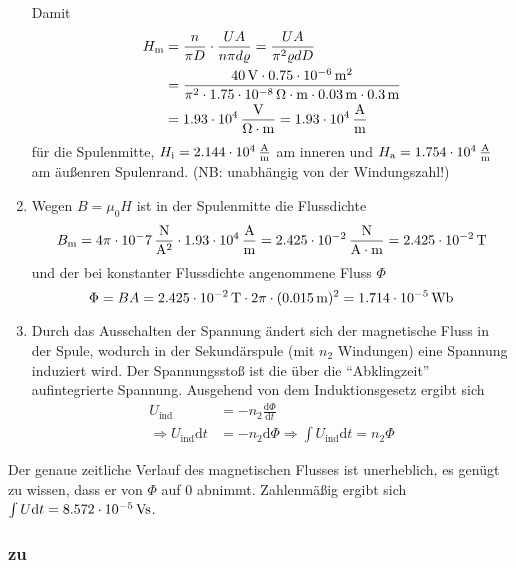 \documentclass[a4paper]{scrartcl}
\begin{document}
\begin{enumerate}[noitemsep]
Damit
\begin{align*}
  H_\text{m} &= \frac{n}{\pi D} \cdot \frac{UA}{n\pi d \varrho} = \frac{UA}{\pi^2\varrho d D} \\
  &= \frac{\unit[40]{V} \cdot \unit[0.75\cdot10^{-6}]{m^2}}{\pi^2 \cdot \unit[1.75\cdot 10^{-8}]{\Omega \cdot m} \cdot\unit[0.03]{m} \cdot \unit[0.3]{m}} \\
  &= \unit[1.93 \cdot 10^4]{\frac{V}{\Omega \cdot m}} = \unit[1.93 \cdot 10^4]{\frac{A}{m}}
\end{align*}
für die Spulenmitte, $H_\text{i} = \unit[2.144\cdot 10^4]{\frac{A}{m}}$ am inneren und $H_\text{a} = \unit[1.754\cdot 10^4]{\frac{A}{m}}$ am äußenren Spulenrand. (NB: unabhängig von der Windungszahl!)
\item Wegen $B = \mu_0 H$ ist in der Spulenmitte die Flussdichte
  \begin{equation*}
    B_\text{m} = 4\pi \cdot \unit[10^-7]{\frac{N}{A^2}} \cdot \unit[1.93 \cdot 10^4]{\frac{A}{m}} = \unit[2.425\cdot 10^{-2}]{\frac{N}{A\cdot m}}= \unit[2.425\cdot 10^{-2}]{T}
  \end{equation*}
  und der bei konstanter Flussdichte angenommene Fluss $\Phi$
  \begin{equation*}
    \Phi = BA = \unit[2.425\cdot 10^{-2}]{T} \cdot 2\pi \cdot (\unit[0.015]{m})^2 = \unit[1.714 \cdot 10^{-5}]{Wb}
  \end{equation*}
\item Durch das Ausschalten der Spannung ändert sich der magnetische Fluss in der Spule, wodurch in der Sekundärspule (mit $n_2$ Windungen) eine Spannung induziert wird. Der Spannungsstoß ist die über die "`Abklingzeit"' aufintegrierte Spannung. Ausgehend von dem Induktionsgesetz ergibt sich
  \begin{align*}
    U_\text{ind} & = -n_2\frac{\text{d}\Phi}{\text{d}t} \\
    \Rightarrow U_\text{ind} \text{d}t &= - n_2 \text{d}\Phi \Rightarrow \int U_\text{ind}\text{d}t = n_2 \Phi
  \end{align*}
\end{enumerate}
Der genaue zeitliche Verlauf des magnetischen Flusses ist unerheblich, es genügt zu wissen, dass er von $\Phi$ auf 0 abnimmt. Zahlenmäßig ergibt sich $\int U\text{d}t = \unit[8.572\cdot 10^{-5}]{Vs}$.

\subsubsection{zu }
\label{lsg:RingspuleMit}
\end{document}
